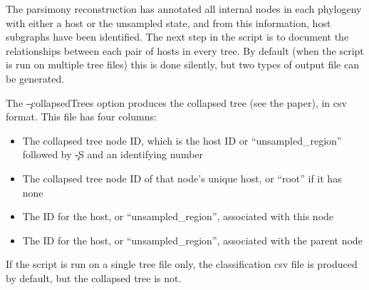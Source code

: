 The parsimony reconstruction has annotated all internal nodes in each phylogeny with either a host or the unsampled state, and from this information, host subgraphs have been identified.
The next step in the script is to document the relationships between each pair of hosts in every tree.
By default (when the script is run on multiple tree files) this is done silently, but two types of output file can be generated.

The \c{--collapsedTrees} option produces the collapsed tree (see the \p paper), in csv format.
This file has four columns:
\begin{itemize}
\item The collapsed tree node ID, which is the host ID or ``unsampled\_region'' followed by \c{-S} and an identifying number
\item The collapsed tree node ID of that node’s unique host, or ``root'' if it has none
\item The ID for the host, or ``unsampled\_region'', associated with this node
\item The ID for the host, or ``unsampled\_region'', associated with the parent node
\end{itemize}

If the script is run on a single tree file only, the classification csv file is produced by default, but the collapsed tree is not.

